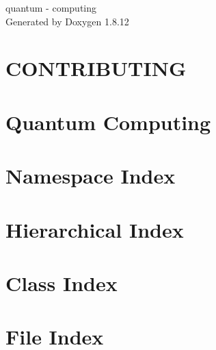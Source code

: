 \documentclass[twoside]{book}
\newcommand{\+}{\discretionary{\mbox{\scriptsize$\hookleftarrow$}}{}{}}
\newcommand{\clearemptydoublepage}{%
  \newpage{\pagestyle{empty}\cleardoublepage}%
}
\begin{document}
\hypersetup{pageanchor=false,
             bookmarksnumbered=true,
             pdfencoding=unicode
            }
\begin{titlepage}
\vspace*{7cm}
\begin{center}%
{\Large quantum -\/ computing }\\
\vspace*{1cm}
{\large Generated by Doxygen 1.8.12}\\
\end{center}
\end{titlepage}
\clearemptydoublepage
{}
\tableofcontents
\clearemptydoublepage
{}
\hypersetup{pageanchor=true}

\chapter{C\+O\+N\+T\+R\+I\+B\+U\+T\+I\+NG}
\label{md__c_1__users__dacian__desktop__quantum__quantum_quantum_computing-master__c_o_n_t_r_i_b_u_t_i_n_g}
\hypertarget{md__c_1__users__dacian__desktop__quantum__quantum_quantum_computing-master__c_o_n_t_r_i_b_u_t_i_n_g}{}

\chapter{Quantum Computing}
\label{md__c_1__users__dacian__desktop__quantum__quantum_quantum_computing-master__r_e_a_d_m_e}
\hypertarget{md__c_1__users__dacian__desktop__quantum__quantum_quantum_computing-master__r_e_a_d_m_e}{}

\chapter{Namespace Index}

\chapter{Hierarchical Index}

\chapter{Class Index}

\chapter{File Index}

\end{document}
